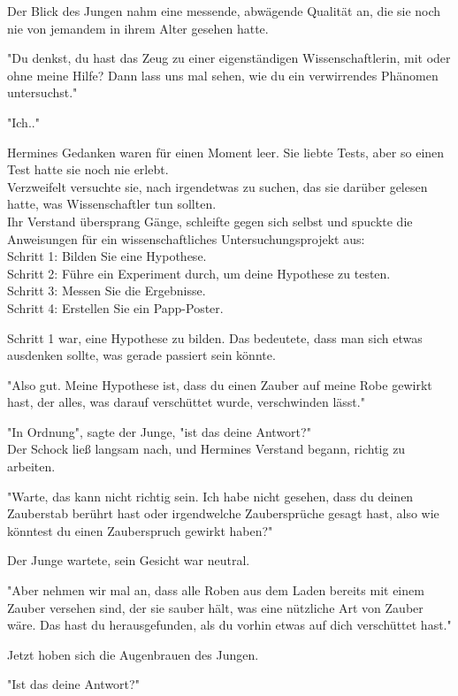 {Der Blick des Jungen nahm eine messende, abwägende Qualität an, die sie noch nie von jemandem in ihrem Alter gesehen hatte.

"Du denkst, du hast das Zeug zu einer eigenständigen Wissenschaftlerin, mit oder ohne meine Hilfe? Dann lass uns mal sehen, wie du ein verwirrendes Phänomen untersuchst."

"Ich.."

Hermines Gedanken waren für einen Moment leer. Sie liebte Tests, aber so einen Test hatte sie noch nie erlebt.\\ Verzweifelt versuchte sie, nach irgendetwas zu suchen, das sie darüber gelesen hatte, was Wissenschaftler tun sollten.\\ Ihr Verstand übersprang Gänge, schleifte gegen sich selbst und spuckte die Anweisungen für ein wissenschaftliches Untersuchungsprojekt aus:\\ Schritt 1: Bilden Sie eine Hypothese.\\ Schritt 2: Führe ein Experiment durch, um deine Hypothese zu testen.\\ Schritt 3: Messen Sie die Ergebnisse.\\ Schritt 4: Erstellen Sie ein Papp-Poster.

Schritt 1 war, eine Hypothese zu bilden. Das bedeutete, dass man sich etwas ausdenken sollte, was gerade passiert sein könnte.

"Also gut. Meine Hypothese ist, dass du einen Zauber auf meine Robe gewirkt hast, der alles, was darauf verschüttet wurde, verschwinden lässt."

"In Ordnung", sagte der Junge, "ist das deine Antwort?"\\ Der Schock ließ langsam nach, und Hermines Verstand begann, richtig zu arbeiten.

"Warte, das kann nicht richtig sein. Ich habe nicht gesehen, dass du deinen Zauberstab berührt hast oder irgendwelche Zaubersprüche gesagt hast, also wie könntest du einen Zauberspruch gewirkt haben?"

Der Junge wartete, sein Gesicht war neutral.

"Aber nehmen wir mal an, dass alle Roben aus dem Laden bereits mit einem Zauber versehen sind, der sie sauber hält, was eine nützliche Art von Zauber wäre. Das hast du herausgefunden, als du vorhin etwas auf dich verschüttet hast."

Jetzt hoben sich die Augenbrauen des Jungen.

"Ist das deine Antwort?"

}
